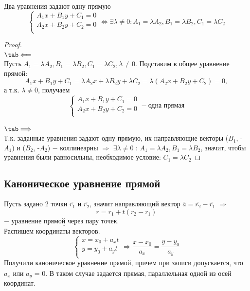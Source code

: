 \begin{theorem}
    Два уравнения задают одну прямую
    \[
    \begin{cases}
        A_1 x + B_1 y + C_1 = 0\\
        A_2 x + B_2 y + C_2 = 0\\
    \end{cases} \Longleftrightarrow \exists\lambda\neq 0 : A_1 = \lambda A_2, B_1 = \lambda B_2, C_1 = \lambda C_2
    \]
\end{theorem}
\begin{proof}
    \tab\\
    $\tab\Longleftarrow$\\
    Пусть $A_1 = \lambda A_2, B_1 = \lambda B_2, C_1 = \lambda C_2, \lambda\neq 0$. Подставим в общее уравнение прямой:
    \[
    A_1 x + B_1 y + C_1 = \lambda A_2 x + \lambda B_2 y + \lambda C_2 = \lambda(A_2 x + B_2 y + C_2) = 0,
    \]
    а т.к. $\lambda\neq 0$, получаем
    \[
    \begin{cases}
        A_1 x + B_1 y + C_1 = 0\\
        A_2 x + B_2 y + C_2 = 0\\
    \end{cases} - \text{одна прямая}
    \]

    $\tab\Longrightarrow$\\
    Т.к. заданные уравнения задают одну прямую, их направляющие векторы ($B_1$, -$A_1$) и ($B_2$, -$A_2$) $-$ коллинеарны $\Longrightarrow$ $\exists\lambda\neq 0$ : $A_1 = \lambda A_2, B_1 = \lambda B_2$, значит, чтобы уравнения были равносильны, необходимое условие: $C_1 = \lambda C_2$
\end{proof}

\subsection{Каноническое уравнение прямой}

Пусть задано 2 точки $\overline{r_1}$ и $\overline{r_2}$, значит направляющий вектор $\overline{a} = \overline{r_2} - \overline{r_1}$ $\Longrightarrow$
\[
\overline{r} = \overline{r_1} + t(\overline{r_2} - \overline{r_1})
\]
$-$ $\underline{\text{уравнение прямой через пару точек}}$.\\

Распишем координаты векторов.
\[
\begin{cases}
    x = x_0 + a_x t\\
    y = y_0 + a_y t\\
\end{cases} \Longrightarrow \dfrac{x - x_0}{a_x} = \dfrac{y - y_0}{a_y}
\]
Получили $\underline{\text{каноническое уравнение прямой}}$, причем при записи допускается, что $a_x$ или $a_y$ = 0. В таком случае задается прямая, параллельная одной из осей координат.\\

